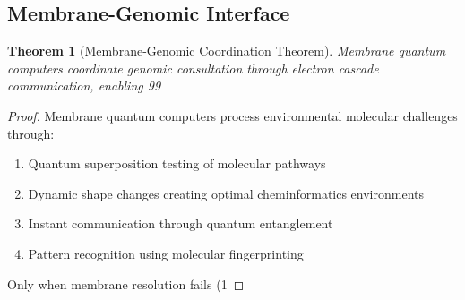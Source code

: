 \documentclass[12pt,a4paper]{article}
\newtheorem{theorem}{Theorem}[section]
\begin{document}
\subsection{Membrane-Genomic Interface}

\begin{theorem}[Membrane-Genomic Coordination Theorem]
Membrane quantum computers coordinate genomic consultation through electron cascade communication, enabling 99%
\end{theorem}

\begin{proof}
Membrane quantum computers process environmental molecular challenges through:
\begin{enumerate}
\item Quantum superposition testing of molecular pathways
\item Dynamic shape changes creating optimal cheminformatics environments
\item Instant communication through quantum entanglement
\item Pattern recognition using molecular fingerprinting
\end{enumerate}

Only when membrane resolution fails (1%
\end{proof}
\end{document}
